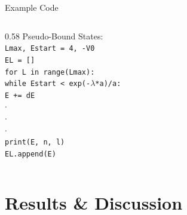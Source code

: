 \documentclass{beamer}
\begin{document}
\begin{frame}{Example Code}
\begin{columns}
    \begin{column}{0.58\textwidth}
    \large{Pseudo-Bound States:}
        \\
        \vspace{.2cm}
        \small{
        \texttt{Lmax, Estart = 4, -V0} \\
        \texttt{EL = []} \\
        \texttt{for L in range(Lmax):} \\
        \hspace{0.5cm} \texttt{while Estart < exp(-$\lambda$*a)/a:} \\
        \hspace{0.5cm} \hspace{0.5cm} \texttt{E += dE} \\
        \hspace{0.5cm} \hspace{1cm} \texttt{$\cdot$} \\
        \hspace{0.5cm} \hspace{1cm} \texttt{$\cdot$} \\
        \hspace{0.5cm} \hspace{1cm} \texttt{$\cdot$} \\
        \hspace{0.5cm} \hspace{0.5cm} \texttt{print(E, n, l)} \\
        \hspace{0.5cm} \texttt{EL.append(E)} \\
        }
    
    \end{column}
\end{columns}
    
\end{frame}


\section{Results \& Discussion}

\end{document}
